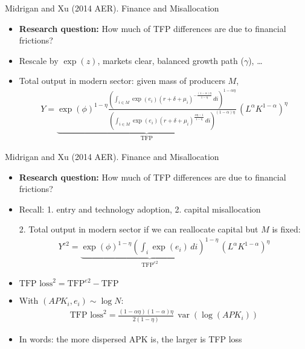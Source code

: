 \documentclass[aspectratio=169,compress,t,xcolor=table]{beamer}
\DeclareMathOperator{\var}{var}                            %
\begin{document}
\begin{frame}{}
Midrigan and Xu (2014 AER). Finance and Misallocation
  \begin{itemize}
    \item {\color{MyStructure}\textbf{Research question:}} How much of TFP differences are due to financial frictions?
    \vfill\item Rescale by \(\exp(z)\), markets clear, balanced growth path (\(\gamma\)), \ldots
    \vfill\item Total output in modern sector: given mass of producers \(M\),
    \begin{align*}
      Y = \underbrace{\exp(\phi)^{1-\eta} \frac{\left( \int_{i \in M} \exp(e_i) (r + \delta + \mu_i)^{-\frac{(1-\alpha)\eta}{1-\eta}} \, di \right)^{1-\alpha\eta}}{\left( \int_{i \in M} \exp(e_i) (r + \delta + \mu_i)^{\frac{\alpha\eta-1}{1-\eta}} \, di \right)^{(1-\alpha)\eta}}}_{\text{TFP}} \, (L^{\alpha} K^{1-\alpha})^{\eta}
    \end{align*}
  \end{itemize}
\end{frame}

\begin{frame}{}
Midrigan and Xu (2014 AER). Finance and Misallocation
  \begin{itemize}
    \item {\color{MyStructure}\textbf{Research question:}} How much of TFP differences are due to financial frictions?
    \item Recall: {\color{MyStructure}1.} entry and technology adoption, {\color{MyStructure}2.} capital misallocation
    \pause
    \vfill\item[2.] Total output in modern sector if we can reallocate capital but \(M\) is fixed:
    \begin{align*}
      Y^{e2} = \underbrace{\exp(\phi)^{1-\eta} \left( \int_i \exp(e_i) \, di \right)^{1-\eta}}_{\text{TFP}^{e2}} \, (L^{\alpha} K^{1-\alpha})^{\eta}
    \end{align*}
    \vfill\item \(\text{TFP loss}^2 = \text{TFP}^{e2} - \text{TFP}\)
    \item With \((APK_i, e_i) \sim \log N\):
    \begin{align*}
      \text{TFP loss}^2 = \frac{(1-\alpha\eta) (1-\alpha)\eta}{2(1-\eta)} \, \var(\log(APK_i))
    \end{align*}
    \item In words: the more dispersed APK is, the larger is TFP loss
  \end{itemize}
\end{frame}
\end{document}
